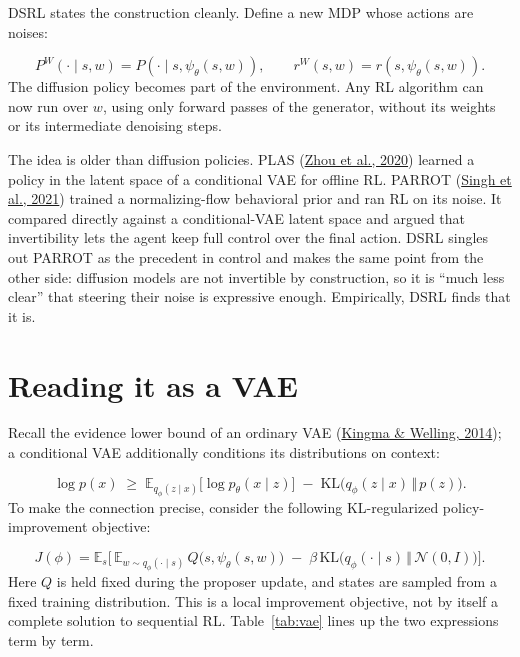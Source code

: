 DSRL states the construction cleanly. Define a new MDP whose actions are noises:

\begin{equation}
P^{W}(\cdot \mid s, w) = P(\cdot \mid s, \psi_\theta(s, w)), \qquad r^{W}(s, w) = r(s, \psi_\theta(s, w)).
\end{equation}
The diffusion policy becomes part of the environment. Any RL algorithm can now run over $w$, using only forward passes of the generator, without its weights or its intermediate denoising steps.

The idea is older than diffusion policies. PLAS (\hyperlink{ref:4}{Zhou et al., 2020}) learned a policy in the latent space of a conditional VAE for offline RL. PARROT (\hyperlink{ref:3}{Singh et al., 2021}) trained a normalizing-flow behavioral prior and ran RL on its noise. It compared directly against a conditional-VAE latent space and argued that invertibility lets the agent keep full control over the final action. DSRL singles out PARROT as the precedent in control and makes the same point from the other side: diffusion models are not invertible by construction, so it is ``much less clear'' that steering their noise is expressive enough. Empirically, DSRL finds that it is.

\section{Reading it as a VAE}
\label{sec:2}
Recall the evidence lower bound of an ordinary VAE (\hyperlink{ref:21}{Kingma \& Welling, 2014}); a conditional VAE additionally conditions its distributions on context:

\begin{equation}
\log p(x) \;\ge\; \mathbb{E}_{q_\phi(z \mid x)}\big[\log p_\theta(x \mid z)\big] \;-\; \mathrm{KL}\big(q_\phi(z \mid x) \,\Vert\, p(z)\big).
\end{equation}
To make the connection precise, consider the following KL-regularized policy-improvement objective:

\begin{equation}
J(\phi) = \mathbb{E}_{s}\Big[\, \mathbb{E}_{w \sim q_\phi(\cdot \mid s)}\, Q\big(s, \psi_\theta(s, w)\big) \;-\; \beta\, \mathrm{KL}\big(q_\phi(\cdot \mid s) \,\Vert\, \mathcal{N}(0, I)\big) \Big].
\end{equation}
Here $Q$ is held fixed during the proposer update, and states are sampled from a fixed training distribution. This is a local improvement objective, not by itself a complete solution to sequential RL. Table~\ref{tab:vae} lines up the two expressions term by term.

